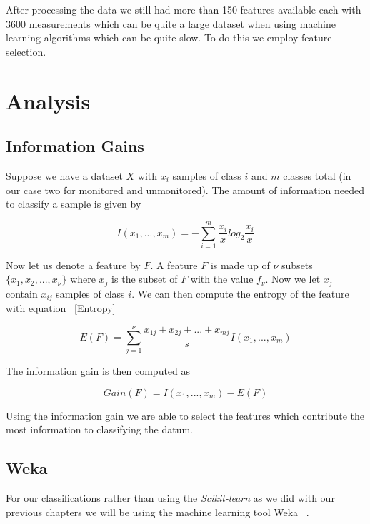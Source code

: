 After processing the data we still had more than 150 features available each with 3600 measurements which can be quite a large dataset when using machine learning algorithms which can be quite slow. To do this we employ feature selection.


\section{Analysis}
\subsection{Information Gains}
Suppose we have a dataset $X$ with $x_i$ samples of class $i$ and $m$ classes total (in our case two for monitored and unmonitored). The amount of information needed to classify a sample is given by 

\begin{equation}\label{InfoGain}
	I(x_1,...,x_m)=-\sum_{i=1}^{m}\frac{x_i}{x}log_2 \frac{x_i}{x}
\end{equation}

Now let us denote a feature by $F$. A feature $F$ is made up of $\nu$ subsets $\{x_1,x_2,...,x_\nu \}$ where $x_j$ is the subset of $F$ with the value $f_\nu$. Now we let $x_j$ contain $x_{ij}$ samples of class $i$. We can then compute the entropy of the feature with equation ~\ref{Entropy} 

\begin{equation}\label{Entropy}
	E(F) = \sum_{j=1}^{\nu} \frac{x_{1j}+x_{2j}+...+x_{mj}}{s}I(x_1,...,x_m)
\end{equation}

The information gain is then computed as 

\begin{equation}\label{Gain}
	Gain(F)=I(x_1,...,x_m)-E(F)
\end{equation}

Using the information gain we are able to select the features which contribute the most information to classifying the datum. 

\subsection{Weka}
For our classifications rather than using the \textit{Scikit-learn} as we did with our previous chapters we will be using the machine learning tool Weka ~\cite{all2009weka}. 